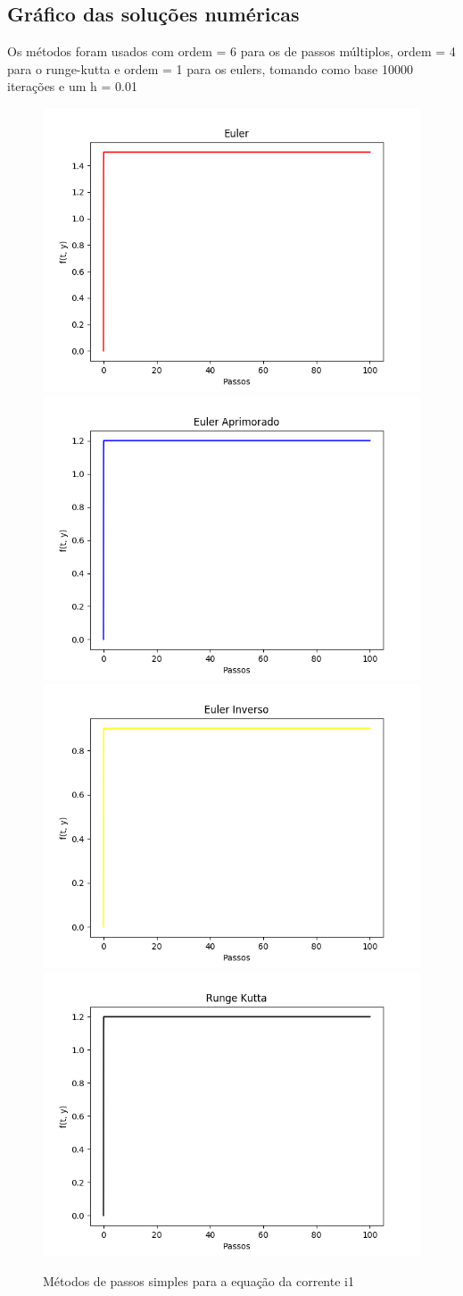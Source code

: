 \documentclass[12pt]{article}%
\begin{document}
    \newpage
    \subsection{Gráfico das soluções numéricas}
    Os métodos foram usados com ordem = 6 para os de passos múltiplos, ordem = 4 para o runge-kutta e ordem = 1 para os eulers, tomando como base 10000 iterações e um h = 0.01
    \begin{figure}[H]
        \begin{center}
            \includegraphics[width=.4\textwidth]{problemas/metodos_q2/circuito_euler.png}
            \includegraphics[width=.4\textwidth]{problemas/metodos_q2/circuito_euler_aprimorado.png}
            \includegraphics[width=.4\textwidth]{problemas/metodos_q2/circuito_euler_inverso.png}
            \includegraphics[width=.4\textwidth]{problemas/metodos_q2/circuito_runge_kutta.png}
        \end{center}
        \caption{Métodos de passos simples para a equação da corrente i1}
    \end{figure}
\end{document}
